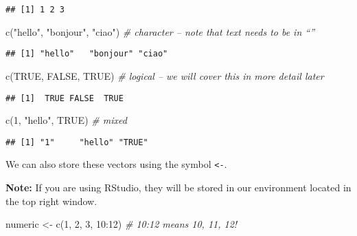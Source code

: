 \documentclass[
]{book}
\newenvironment{Shaded}{\begin{snugshade}}{\end{snugshade}}
\newcommand{\CommentTok}[1]{\textcolor[rgb]{0.56,0.35,0.01}{\textit{#1}}}
\newcommand{\ConstantTok}[1]{\textcolor[rgb]{0.00,0.00,0.00}{#1}}
\newcommand{\DecValTok}[1]{\textcolor[rgb]{0.00,0.00,0.81}{#1}}
\newcommand{\FunctionTok}[1]{\textcolor[rgb]{0.00,0.00,0.00}{#1}}
\newcommand{\NormalTok}[1]{#1}
\newcommand{\OtherTok}[1]{\textcolor[rgb]{0.56,0.35,0.01}{#1}}
\newcommand{\SpecialCharTok}[1]{\textcolor[rgb]{0.00,0.00,0.00}{#1}}
\newcommand{\StringTok}[1]{\textcolor[rgb]{0.31,0.60,0.02}{#1}}
\begin{document}
\begin{verbatim}
## [1] 1 2 3
\end{verbatim}

\begin{Shaded}
\begin{Highlighting}[]
\FunctionTok{c}\NormalTok{(}\StringTok{"hello"}\NormalTok{, }\StringTok{"bonjour"}\NormalTok{, }\StringTok{"ciao"}\NormalTok{) }\CommentTok{\# character – note that text needs to be in “”}
\end{Highlighting}
\end{Shaded}

\begin{verbatim}
## [1] "hello"   "bonjour" "ciao"
\end{verbatim}

\begin{Shaded}
\begin{Highlighting}[]
\FunctionTok{c}\NormalTok{(}\ConstantTok{TRUE}\NormalTok{, }\ConstantTok{FALSE}\NormalTok{, }\ConstantTok{TRUE}\NormalTok{) }\CommentTok{\# logical – we will cover this in more detail later}
\end{Highlighting}
\end{Shaded}

\begin{verbatim}
## [1]  TRUE FALSE  TRUE
\end{verbatim}

\begin{Shaded}
\begin{Highlighting}[]
\FunctionTok{c}\NormalTok{(}\DecValTok{1}\NormalTok{, }\StringTok{"hello"}\NormalTok{, }\ConstantTok{TRUE}\NormalTok{) }\CommentTok{\# mixed}
\end{Highlighting}
\end{Shaded}

\begin{verbatim}
## [1] "1"     "hello" "TRUE"
\end{verbatim}

We can also store these vectors using the symbol \texttt{\textless{}-}.

\textbf{Note:} If you are using RStudio, they will be stored in our environment located in the top right window.

\begin{Shaded}
\begin{Highlighting}[]
\NormalTok{numeric }\OtherTok{\textless{}{-}} \FunctionTok{c}\NormalTok{(}\DecValTok{1}\NormalTok{, }\DecValTok{2}\NormalTok{, }\DecValTok{3}\NormalTok{, }\DecValTok{10}\SpecialCharTok{:}\DecValTok{12}\NormalTok{) }\CommentTok{\# 10:12 means 10, 11, 12!}
\end{Highlighting}
\end{Shaded}
\end{document}
